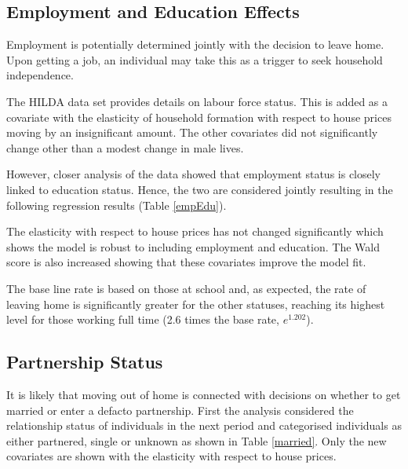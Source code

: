 \documentclass[12pt]{article}
\begin{document}


\subsection{Employment and Education Effects}

Employment is potentially determined jointly with the decision to leave home. Upon getting a job, an individual may take this as a trigger to seek household independence.

The HILDA data set provides details on labour force status. This is added as a covariate with the elasticity of household formation with respect to house prices moving by an insignificant amount. The other covariates did not significantly change other than a modest change in male lives.

However, closer analysis of the data showed that employment status is closely linked to education status. Hence, the two are considered jointly resulting in the following regression results (Table \ref{empEdu}).



The elasticity with respect to house prices has not changed significantly which shows the model is robust to including employment and education. The Wald score is also increased showing that these covariates improve the model fit.

The base line rate is based on those at school and, as expected, the rate of leaving home is significantly greater for the other statuses, reaching its highest level for those working full time (2.6 times the base rate, $e^{1.202}$).

\subsection{Partnership Status}
It is likely that moving out of home is connected with decisions on whether to get married or enter a defacto partnership. First the analysis considered the relationship status of individuals in the next period and categorised individuals as either partnered, single or unknown as shown in Table \ref{married}. Only the new covariates are shown with the elasticity with respect to house prices.
\end{document}
